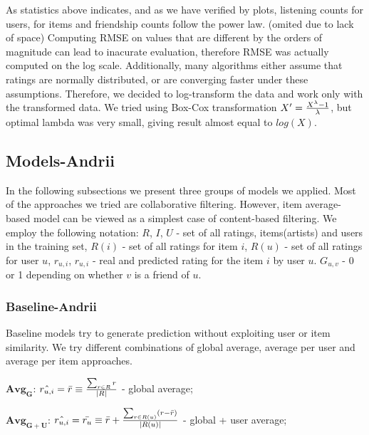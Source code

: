 \documentclass{article} %
\begin{document}
As statistics above indicates, and as we have verified by plots, listening
counts for users, for items and friendship counts follow the power law. (omited
due to lack of space)
Computing RMSE on values that are different by the orders of magnitude can lead
to inacurate evaluation, therefore RMSE was actually computed on the log scale.
Additionally, many algorithms either assume that ratings are normally
distributed, or are converging faster under these assumptions. Therefore, we
decided to log-transform the data and work only with the transformed data. We
tried using Box-Cox transformation $X' = {X^{\lambda} - 1 \over \lambda}$,
but optimal lambda was very small, giving result almost equal to $log(X)$. 


\subsection{Models-Andrii}

In the following subsections we present three groups of models we applied.
Most of the approaches we tried are collaborative filtering. However, item
average-based model can be viewed as a simplest case of content-based filtering.
We employ the following notation: $R$, $I$, $U$ - set of all ratings,
items(artists) and users in the training set, $R(i)$ - set of all ratings for
item $i$, $R(u)$ - set of all ratings for user $u$, $r_{u,i}$, $\hat{r_{u,i}}$ -
real and predicted rating for the item $i$ by user $u$. $G_{u,v}$ - 0 or 1
depending on whether $v$ is a friend of $u$.

\subsubsection{Baseline-Andrii}

Baseline models try to generate prediction without exploiting user or item
similarity. We try different combinations of global average, average per
user and average per item approaches.

$\bm{Avg_G}$: $\hat{r_{u,i}} = \bar{r} \equiv {\sum_{r \in R}r \over |R|}$ -
global average;

$\bm{Avg_{G+U}}$: $\hat{r_{u,i}} = \bar{r_u} \equiv \bar{r} +  {\sum_{r \in
R(u)}(r - \bar{r}) \over |R(u)|}$ - global + user average;
\end{document}
